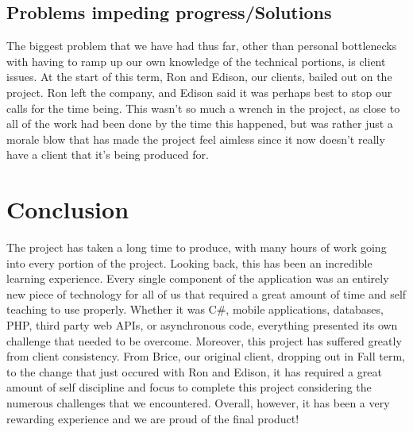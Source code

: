 \documentclass[letterpaper,10pt,titlepage,journal,compsoc,draftclsnofoot,onecolumn]{IEEEtran}
\begin{document}
\subsection{Problems impeding progress/Solutions}

The biggest problem that we have had thus far, other than personal bottlenecks with having to ramp up our own knowledge of the technical portions, is client issues. At the start of this term, Ron and Edison, our clients, bailed out on the project. Ron left the company, and Edison said it was perhaps best to stop our calls for the time being. This wasn't so much a wrench in the project, as close to all of the work had been done by the time this happened, but was rather just a morale blow that has made the project feel aimless since it now doesn't really have a client that it's being produced for.

\section{Conclusion}
The project has taken a long time to produce, with many hours of work going into every portion of the project. Looking back, this has been an incredible learning experience. Every single component of the application was an entirely new piece of technology for all of us that required a great amount of time and self teaching to use properly. Whether it was C\#, mobile applications, databases, PHP, third party web APIs, or asynchronous code, everything presented its own challenge that needed to be overcome. Moreover, this project has suffered greatly from client consistency. From Brice, our original client, dropping out in Fall term, to the change that just occured with Ron and Edison, it has required a great amount of self discipline and focus to complete this project considering the numerous challenges that we encountered. Overall, however, it has been a very rewarding experience and we are proud of the final product!
\end{document}
